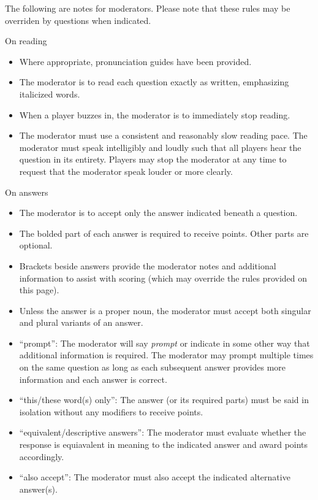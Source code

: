 \thispagestyle{empty}
The following are notes for moderators. Please note that these rules may be overriden by questions when indicated.

\vspace*{0.3 cm}
On reading
\begin{itemize}
    \item Where appropriate, pronunciation guides have been provided.
    \item The moderator is to read each question exactly as written, emphasizing italicized words.
    \item When a player buzzes in, the moderator is to immediately stop reading.
    \item The moderator must use a consistent and reasonably slow reading pace. The moderator must speak intelligibly and loudly such that all players hear the question in its entirety. Players may stop the moderator at any time to request that the moderator speak louder or more clearly.
\end{itemize}

\vspace*{0.3 cm}
On answers
\begin{itemize}
    \item The moderator is to accept only the answer indicated beneath a question.
    \item The bolded part of each answer is required to receive points. Other parts are optional.
    \item Brackets beside answers provide the moderator notes and additional information to assist with scoring (which may override the rules provided on this page).
    \item Unless the answer is a proper noun, the moderator must accept both singular and plural variants of an answer. 
    \item ``prompt'': The moderator will say \textit{prompt} or indicate in some other way that additional information is required. The moderator may prompt multiple times on the same question as long as each subsequent answer provides more information and each answer is correct.
    \item ``this/these word(s) only'': The answer (or its required parts) must be said in isolation without any modifiers to receive points.
    \item ``equivalent/descriptive answers'': The moderator must evaluate whether the response is equiavalent in meaning to the indicated answer and award points accordingly.
    \item ``also accept'': The moderator must also accept the indicated alternative answer(s).
\end{itemize}

